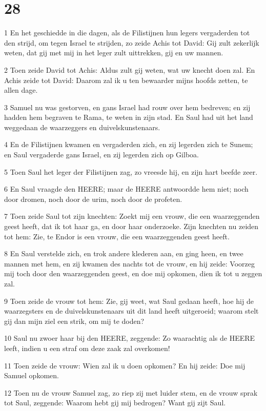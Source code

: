 \chapter{28}

\par 1 En het geschiedde in die dagen, als de Filistijnen hun legers vergaderden tot den strijd, om tegen Israel te strijden, zo zeide Achis tot David: Gij zult zekerlijk weten, dat gij met mij in het leger zult uittrekken, gij en uw mannen.
\par 2 Toen zeide David tot Achis: Aldus zult gij weten, wat uw knecht doen zal. En Achis zeide tot David: Daarom zal ik u ten bewaarder mijns hoofds zetten, te allen dage.
\par 3 Samuel nu was gestorven, en gans Israel had rouw over hem bedreven; en zij hadden hem begraven te Rama, te weten in zijn stad. En Saul had uit het land weggedaan de waarzeggers en duivelskunstenaars.
\par 4 En de Filistijnen kwamen en vergaderden zich, en zij legerden zich te Sunem; en Saul vergaderde gans Israel, en zij legerden zich op Gilboa.
\par 5 Toen Saul het leger der Filistijnen zag, zo vreesde hij, en zijn hart beefde zeer.
\par 6 En Saul vraagde den HEERE; maar de HEERE antwoordde hem niet; noch door dromen, noch door de urim, noch door de profeten.
\par 7 Toen zeide Saul tot zijn knechten: Zoekt mij een vrouw, die een waarzeggenden geest heeft, dat ik tot haar ga, en door haar onderzoeke. Zijn knechten nu zeiden tot hem: Zie, te Endor is een vrouw, die een waarzeggenden geest heeft.
\par 8 En Saul verstelde zich, en trok andere klederen aan, en ging heen, en twee mannen met hem, en zij kwamen des nachts tot de vrouw, en hij zeide: Voorzeg mij toch door den waarzeggenden geest, en doe mij opkomen, dien ik tot u zeggen zal.
\par 9 Toen zeide de vrouw tot hem: Zie, gij weet, wat Saul gedaan heeft, hoe hij de waarzegsters en de duivelskunstenaars uit dit land heeft uitgeroeid; waarom stelt gij dan mijn ziel een strik, om mij te doden?
\par 10 Saul nu zwoer haar bij den HEERE, zeggende: Zo waarachtig als de HEERE leeft, indien u een straf om deze zaak zal overkomen!
\par 11 Toen zeide de vrouw: Wien zal ik u doen opkomen? En hij zeide: Doe mij Samuel opkomen.
\par 12 Toen nu de vrouw Samuel zag, zo riep zij met luider stem, en de vrouw sprak tot Saul, zeggende: Waarom hebt gij mij bedrogen? Want gij zijt Saul.
